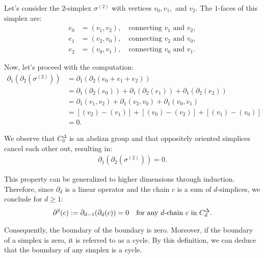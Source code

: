 \begin{example}
	Let's consider the \(2\)-simplex \( \sigma^{(2)} \) with vertices \( v_{0}, v_{1}, \) and \( v_{2} \). The \( 1 \)-faces of this simplex are:
	\begin{align}
		e_{0} & = (v_{1}, v_{2}), \quad \text{connecting } v_{1} \text{ and } v_{2}, \\
		e_{1} & = (v_{2}, v_{0}), \quad \text{connecting } v_{2} \text{ and } v_{0}, \\
		e_{2} & = (v_{0}, v_{1}), \quad \text{connecting } v_{0} \text{ and } v_{1}. 
	\end{align}
				
	Now, let's proceed with the computation:
	\begin{align}
		\partial_1(\partial_2(\sigma^{(2)})) & = \partial_1(\partial_2(e_{0} + e_{1} + e_{2}))                                          \\
		                                 & = \partial_1(\partial_2(e_{0})) + \partial_1(\partial_2(e_{1})) + \partial_1(\partial_2(e_{2}))                      \\
		                                 & = \partial_1(v_{1}, v_{2}) + \partial_1(v_{2}, v_{0}) + \partial_1(v_{0}, v_{1}) \\
		                                 & = [(v_{2}) - (v_{1})] + [(v_{0}) - (v_{2})] + [(v_{1}) - (v_{0})]          \\
		                                 & = 0.                                                                       
	\end{align}
				
	We observe that \( C^{\Delta}_{0} \) is an abelian group and that oppositely oriented simplices cancel each other out, resulting in:
	\begin{align}
		\partial_{1}(\partial_2(\sigma^{(2)})) = 0. 
	\end{align}
				
	This property can be generalized to higher dimensions through induction. Therefore, since \( \partial_d \) is a linear operator and the chain \( c \) is a sum of \( d \)-simplices, we conclude for $d \geq 1$:
	\begin{align}
		\partial^{2}(c) := \partial_{d-1}(\partial_{d}(c)) = 0 \quad \text{for any \( d \)-chain \( c \) in } C^{\Delta}_{d}. 
	\end{align}
				
	Consequently, the boundary of the boundary is zero. Moreover, if the boundary of a simplex is zero, it is referred to as a cycle. By this definition, we can deduce that the boundary of any simplex is a cycle.
\end{example}

